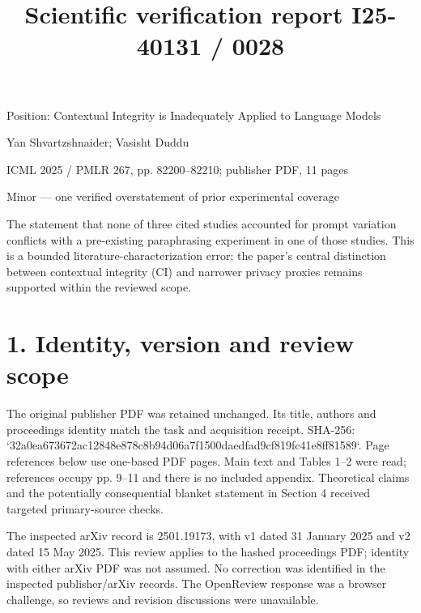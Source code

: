 \documentclass[10pt]{article}
\title{Scientific verification report
I25-40131 / 0028}
\author{}
\date{}
\begin{document}
\maketitle
Position: Contextual Integrity is Inadequately Applied to Language Models\par
Yan Shvartzshnaider; Vasisht Duddu\par
ICML 2025 / PMLR 267, pp. 82200–82210; publisher PDF, 11 pages\par
Minor — one verified overstatement of prior experimental coverage\par
The statement that none of three cited studies accounted for prompt variation conflicts with a pre-existing paraphrasing experiment in one of those studies. This is a bounded literature-characterization error; the paper’s central distinction between contextual integrity (CI) and narrower privacy proxies remains supported within the reviewed scope.\par
\section*{1. Identity, version and review scope}
The original publisher PDF was retained unchanged. Its title, authors and proceedings identity match the task and acquisition receipt. SHA-256: `32a0ea673672ac12848e878c8b94d06a7f1500daedfad9cf819fc41e8ff81589`. Page references below use one-based PDF pages. Main text and Tables 1–2 were read; references occupy pp. 9–11 and there is no included appendix. Theoretical claims and the potentially consequential blanket statement in Section 4 received targeted primary-source checks.\par
The inspected arXiv record is 2501.19173, with v1 dated 31 January 2025 and v2 dated 15 May 2025. This review applies to the hashed proceedings PDF; identity with either arXiv PDF was not assumed. No correction was identified in the inspected publisher/arXiv records. The OpenReview response was a browser challenge, so reviews and revision discussions were unavailable.\par
\end{document}
